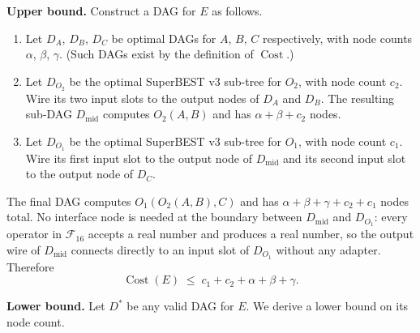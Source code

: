 \documentclass[12pt,a4paper]{article}
\theoremstyle{definition}
\newcommand{\Cost}{\operatorname{Cost}}
\begin{document}
\medskip
\noindent\textbf{Upper bound.}
Construct a DAG for $E$ as follows.

\begin{enumerate}
  \item Let $D_A$, $D_B$, $D_C$ be optimal DAGs for $A$, $B$, $C$
        respectively, with node counts $\alpha$, $\beta$, $\gamma$.
        (Such DAGs exist by the definition of $\Cost$.)
  \item Let $D_{O_2}$ be the optimal SuperBEST v3 sub-tree for $O_2$,
        with node count $c_2$.  Wire its two input slots to the output
        nodes of $D_A$ and $D_B$.  The resulting sub-DAG $D_{\mathrm{mid}}$
        computes $O_2(A,B)$ and has $\alpha + \beta + c_2$ nodes.
  \item Let $D_{O_1}$ be the optimal SuperBEST v3 sub-tree for $O_1$,
        with node count $c_1$.  Wire its first input slot to the output
        node of $D_{\mathrm{mid}}$ and its second input slot to the output
        node of $D_C$.
\end{enumerate}

The final DAG computes $O_1(O_2(A,B), C)$ and has
$\alpha + \beta + \gamma + c_2 + c_1$ nodes total.  No interface node
is needed at the boundary between $D_{\mathrm{mid}}$ and $D_{O_1}$:
every operator in $\mathcal{F}_{16}$ accepts a real number and produces
a real number, so the output wire of $D_{\mathrm{mid}}$ connects directly
to an input slot of $D_{O_1}$ without any adapter.  Therefore
\[
  \Cost(E) \;\leq\; c_1 + c_2 + \alpha + \beta + \gamma.
  \tag{UB}
\]

\medskip
\noindent\textbf{Lower bound.}
Let $D^*$ be any valid DAG for $E$.  We derive a lower bound on its node
count.
\end{document}
